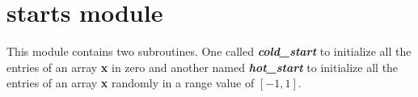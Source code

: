 \section{starts module}

This module contains two subroutines. One called \textit{\textbf{cold\_start}} to initialize all the entries of an array \textbf{x} in zero and another named \textit{\textbf{hot\_start}} to initialize all the entries of an array \textbf{x} randomly in a range value of $[-1,1]$. 